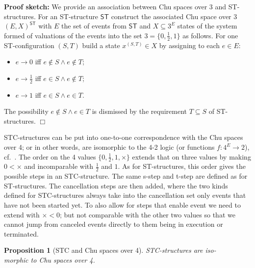 \documentclass[submission,copyright,creativecommons]{eptcs}
\newtheorem{proposition}[theorem]{Proposition}
\newenvironment{proof}[1][\!\!\,]{\vspace{1ex}\noindent\textbf{Proof #1: }}{\hfill$\Box$\vspace{2ex}}
\newcommand\executing{\ensuremath{\frac{1}{2}}}
\newcommand\chu[2]{\ensuremath{(#1,#2)}}
\newcommand\cancellation{\ensuremath{\times}}
\begin{document}
\begin{proof}[sketch]
We provide an association between Chu spaces over 3 and ST-structures.
For an ST-structure $\mathsf{ST}$ construct the associated Chu space over 3 $\chu{E}{X}^{\mathsf{ST}}$ with $E$ the set of events from $\mathsf{ST}$ and $X\subseteq 3^{E}$ states of the system formed of valuations of the events into the set $3=\{0, \executing, 1\}$ as follows. For one ST-configuration $(S,T)$ build a state $x^{(S,T)}\in X$ by assigning to each $e\in E$: 
\begin{itemize}
\item $e \rightarrow 0$ iff $e\not\in S \wedge e\not\in T$;
\item $e \rightarrow \executing$ iff $e\in S \wedge e\not\in T$;
\item $e \rightarrow 1$ iff $e\in S \wedge e\in T$.
\end{itemize}
The possibility $e\!\not\in\!S \wedge e\!\in\!T$ is dismissed by the requirement $T\!\subseteq\!S$ of ST-structures.
\end{proof}



STC-structures can be put into one-to-one correspondence with the Chu spaces over 4; or in other words, are isomorphic to the 4-2 logic (or functions $f:4^{E}\rightarrow 2$), cf.\ \cite{Pratt03trans_cancel}.
The order on the 4 values $\{0,\executing,1,\cancellation\}$ extends that on three values by making $0 < \cancellation$ and incomparable with $\executing$ and $1$. As for ST-structures, this order gives the possible steps in an STC-structure. The same s-step and t-step are defined as for ST-structures. The cancellation steps are then added, where the two kinds defined for STC-structures always take into the cancellation set only events that have not been started yet. 
To also allow for steps that enable event we need to extend with $\cancellation < 0$; but not comparable with the other two values so that we cannot jump from canceled events directly to them being in execution or terminated.


\begin{proposition}[STC and Chu spaces over 4]\label{prop_STC_Chu4}
STC-structures are {iso}-\\{morphic} to \emph{Chu spaces over 4}.
\end{proposition}
\end{document}
